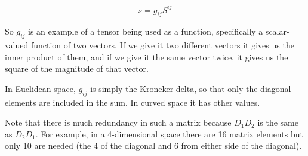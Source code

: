 $$s = g_{ij}S^{ij}$$

So $g_{ij}$ is an example of a tensor being used as a function, specifically a scalar-valued function of two vectors. If we give it two different vectors it gives us the inner product of them, and if we give it the same vector twice, it gives us the square of the magnitude of that vector.

In Euclidean space, $g_{ij}$ is simply the Kroneker delta, so that only the diagonal elements are included in the sum. In curved space it has other values.

Note that there is much redundancy in such a matrix because $D_1D_2$ is the same as $D_2D_1$. For example, in a 4-dimensional space there are 16 matrix elements but only 10 are needed (the 4 of the diagonal and 6 from either side of the diagonal).
